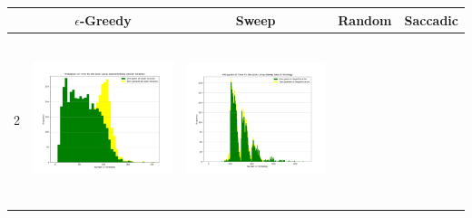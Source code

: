 \begin{landscape}
\begin{table}[h!]
  \centering
  \begin{tabular}{ | c | c | c | c | c |}
    \hline
    & $\epsilon$-Greedy & Sweep & Random & Saccadic \\
    \hline
    2 & 
    \begin{minipage}[c][49mm][c]{49mm}
      \includegraphics[width=49mm, height=49mm]{Chapters/MultiAgentTargetDetection/Figs/Histograms/MultipleAgent/2/SingleAgentSingleSource2EpsilonGreedyHistogram.png}
    \end{minipage}
    &
    \begin{minipage}[c][49mm][c]{49mm}
      \includegraphics[width=49mm, height=49mm]{Chapters/MultiAgentTargetDetection/Figs/Histograms/MultipleAgent/2/SingleAgentSingleSource2SweepHistogram.png}


\end{minipage}
\end{tabular}
\end{table}
\end{landscape}

